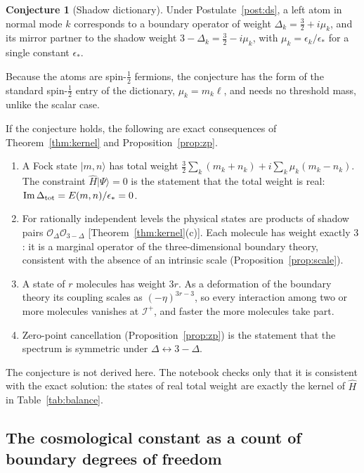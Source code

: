 \documentclass[reprint,aps,prd,amsmath,amssymb,superscriptaddress,nofootinbib,floatfix]{revtex4-2}
\theoremstyle{plain}
\theoremstyle{definition}
\newtheorem{conjecture}{Conjecture}
\theoremstyle{remark}
\newcommand{\ket}[1]{\ensuremath{|#1\rangle}}
\newcommand{\Hc}{\hat{H}}
\begin{document}
\begin{conjecture}[Shadow dictionary]
\label{conj:shadow}
Under Postulate~\ref{post:ds}, a left atom in normal mode $k$ corresponds to a boundary operator of weight
$\Delta_k=\tfrac32+i\mu_k$, and its mirror partner to the shadow weight $3-\Delta_k=\tfrac32-i\mu_k$, with $\mu_k=\epsilon_k/\epsilon_*$ for a
single constant $\epsilon_*$.
\end{conjecture}
Because the atoms are spin-$\tfrac12$ fermions, the conjecture has the form of the standard spin-$\tfrac12$ entry of the
dictionary, $\mu_k=m_k\ell$, and needs no threshold mass, unlike the scalar case.

If the conjecture holds, the following are exact consequences of Theorem~\ref{thm:kernel} and
Proposition~\ref{prop:zp}.
\begin{enumerate}
\item[(i)] A Fock state $\ket{m,n}$ has total weight $\tfrac32\sum_k(m_k+n_k)+i\sum_k\mu_k(m_k-n_k)$. The constraint
$\Hc\ket\Psi=0$ is the statement that the total weight is real: ${\rm Im}\,\Delta_{\rm tot}=E(m,n)/\epsilon_*=0$.
\item[(ii)] For rationally independent levels the physical states are products of shadow pairs
$\mathcal{O}_{\Delta}\mathcal{O}_{3-\Delta}$ [Theorem~\ref{thm:kernel}(c)]. Each molecule has weight exactly $3$: it is a marginal
operator of the three-dimensional boundary theory, consistent with the absence of an intrinsic scale
(Proposition~\ref{prop:scale}).
\item[(iii)] A state of $r$ molecules has weight $3r$. As a deformation of the boundary theory its coupling scales as
$(-\eta)^{3r-3}$, so every interaction among two or more molecules vanishes at $\mathcal{I}^+$, and faster the more molecules
take part.
\item[(iv)] Zero-point cancellation (Proposition~\ref{prop:zp}) is the statement that the spectrum is symmetric under
$\Delta\leftrightarrow3-\Delta$.
\end{enumerate}
The conjecture is not derived here. The notebook checks only that it is consistent with the exact solution: the
states of real total weight are exactly the kernel of $\Hc$ in Table~\ref{tab:balance}.

\subsection{The cosmological constant as a count of boundary degrees of freedom}
\end{document}
